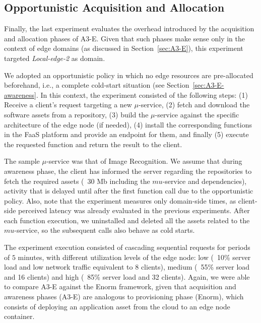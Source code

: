 


\subsection{Opportunistic Acquisition and Allocation}

Finally, the last experiment evaluates the overhead introduced by the acquisition and allocation phases of A3-E. Given that such phases make sense only in the context of edge domains (as discussed in Section~\ref{sec:A3-E}), this experiment targeted \textit{Local-edge-2} as domain. 

We adopted an opportunistic policy in which no edge resources are pre-allocated beforehand, i.e., a complete cold-start situation (see Section~\ref{sec:A3-E-awareness}. In this context, the experiment consisted of the following steps:
(1) Receive a client's request targeting a new $\mu$-service, (2) fetch and download the software assets from a repository, (3) build the $\mu$-service against the specific architecture of the edge node (if needed), (4) install the corresponding functions in the FaaS platform and provide an endpoint for them, and finally (5) execute the requested function and return the result to the client.

The sample $\mu$-service was that of Image Recognition. We assume that during awareness phase, the client has informed the server regarding the repositories to fetch the required assets (~30 Mb including the $mu$-service and dependencies), activity that is delayed until after the first function call due to the opportunistic policy. Also, note that the experiment measures only domain-side times, as client-side perceived latency was already evaluated in the previous experiments. After each function execution, we uninstalled and deleted all the assets related to the $mu$-service, so the subsequent calls also behave as cold starts.

The experiment execution consisted of cascading sequential requests for periods of $5$ minutes, with different utilization levels of the edge node: low (~10\% server load and low network traffic equivalent to 8 clients), medium (~55\% server load and 16 clients) and high (~85\% server load and 32 clients). Again, we were able to compare A3-E against the Enorm framework, given that acquisition and awareness phases (A3-E) are analogous to provisioning phase (Enorm), which consists of deploying an application asset from the cloud to an edge node container. 

